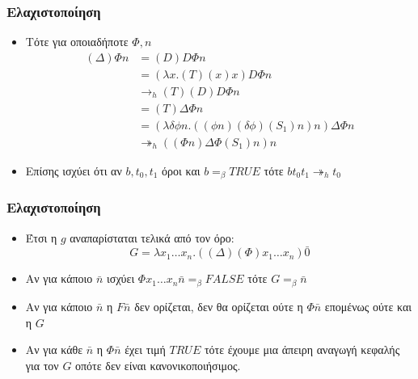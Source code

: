 \documentclass{beamer}
\begin{document}
\begin{frame}
  \frametitle{Ελαχιστοποίηση}
  \begin{itemize}
  \item Τότε για οποιαδήποτε $\Phi, n$
    $$ \begin{array}{ll}
    (\Delta) \Phi n &= (D) D \Phi n \\
    &= (\lambda x. (T) (x) x) D \Phi n \\
    &\rightarrow_h (T) (D) D \Phi n \\
    &= (T) \Delta \Phi n \\
    &= (\lambda \delta \phi n . ((\phi n)(\delta \phi) (S_1) n) n)
    \Delta \Phi n \\
    &\twoheadrightarrow_h ((\Phi n) \Delta \Phi (S_1) n) n
  \end{array}$$
    \pause
  \item Επίσης ισχύει ότι αν $b, t_0, t_1$ όροι και $b =_\beta TRUE$
    τότε $ b t_0 t_1 \twoheadrightarrow_h t_0$
  \end{itemize}
\end{frame}

\begin{frame}
  \frametitle{Ελαχιστοποίηση}
  \begin{itemize}
  \item Έτσι η $g$ αναπαρίσταται τελικά από τον όρο:
    $$G = \lambda x_1 \ldots x_n . ((\Delta) (\Phi) x_1 \ldots x_n)
    \bar{0}$$ \pause
  \item Αν για κάποιο $\bar{n}$ ισχύει $\Phi x_1 \ldots x_n
    \bar{n}=_\beta FALSE$ τότε $G =_\beta\bar{n}$ \pause
  \item Αν για κάποιο $\bar{n}$ η $F \bar{n}$ δεν ορίζεται, δεν θα
    ορίζεται ούτε η $\Phi \bar{n}$ επομένως ούτε και η $G$ \pause
  \item Αν για κάθε $\bar{n}$ η $\Phi \bar{n}$ έχει τιμή $TRUE$ τότε
    έχουμε μια άπειρη αναγωγή κεφαλής για τον $G$ οπότε δεν είναι
    κανονικοποιήσιμος.
  \end{itemize}
\end{frame}
\end{document}
